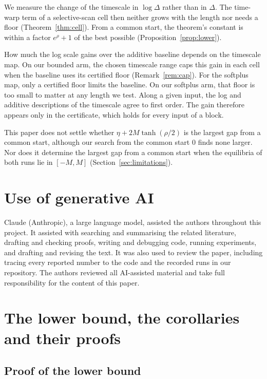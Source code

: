 \documentclass[11pt, a4paper]{article}
\theoremstyle{remark}
\theoremstyle{plain}
\begin{document}
We measure the change of the timescale in $\log\Delta$ rather than in $\Delta$. The time-warp term
of a selective-scan cell then neither grows with the length nor needs a floor
(Theorem~\ref{thm:cell}). From a common start, the theorem's constant is within a factor
$e^{\rho} + 1$ of the best possible (Proposition~\ref{prop:lower}).

How much the log scale gains over the additive baseline depends on the timescale map. On our
bounded arm, the chosen timescale range caps this gain in each cell when the baseline uses its
certified floor (Remark~\ref{rem:cap}). For the softplus map, only a certified floor limits the
baseline. On our softplus arm, that floor is too small to matter at any length we test. Along a
given input, the log and additive descriptions of the timescale agree to first order. The gain
therefore appears only in the certificate, which holds for every input of a block.

This paper does not settle whether $\eta + 2M\tanh(\rho/2)$ is the largest gap from a common start,
although our search from the common start $0$ finds none larger. Nor does it determine the largest
gap from a common start when the equilibria of both runs lie in $[-M, M]$
(Section~\ref{sec:limitations}).

\section*{Use of generative AI}

Claude (Anthropic), a large language model, assisted the authors throughout this project. It
assisted with searching and summarising the related literature, drafting and checking proofs,
writing and debugging code, running experiments, and drafting and revising the text. It was
also used to review the paper, including tracing every reported number to the code and the
recorded runs in our repository. The authors reviewed all AI-assisted material and take full
responsibility for the content of this paper.




\appendix

\section{The lower bound, the corollaries and their proofs}
\label{app:proofs}

\subsection{Proof of the lower bound}
\label{app:lower}
\end{document}
